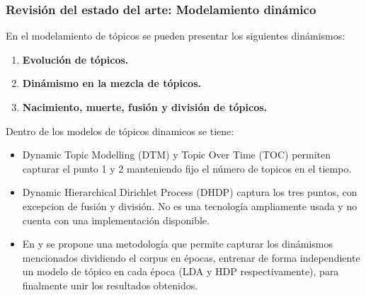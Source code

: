 \documentclass[
	spanish, %
	aspectratio=43, %
	hyperref={pdfencoding=auto,psdextra},
	xcolor={dvipsnames,table,usenames}
]{beamer}
\begin{document}
\begin{frame}
\frametitle{Revisión del estado del arte: Modelamiento dinámico}
En el modelamiento de tópicos se pueden presentar los siguientes dinámismos:

\begin{enumerate}
  \item \textbf{Evolución de tópicos.}
  \item \textbf{Dinámismo en la mezcla de tópicos.}
  \item \textbf{Nacimiento, muerte, fusión y división de tópicos.}
\end{enumerate}

Dentro de los modelos de tópicos dinamicos se tiene:
\begin{itemize}
  \item Dynamic Topic Modelling (DTM) y Topic Over Time (TOC)\cite{wang2006topics} permiten capturar el punto 1 y 2 manteniendo fijo el número de topicos en el tiempo.
  \item Dynamic Hierarchical Dirichlet Process (DHDP)\cite{ahmed2012timeline} captura los tres puntos, con excepcion de fusión y división. No es una tecnología ampliamente usada y no cuenta con una implementación disponible.\\
  \item En \cite{wilson2011tracking} y \cite{beykikhoshk2018discovering} se propone una metodología que permite capturar los dinámismos mencionados dividiendo el corpus en épocas, entrenar de forma independiente un modelo de tópico en cada época (LDA y HDP respectivamente), para finalmente unir los resultados obtenidos. 
\end{itemize}

%


\end{frame}
\end{document}
